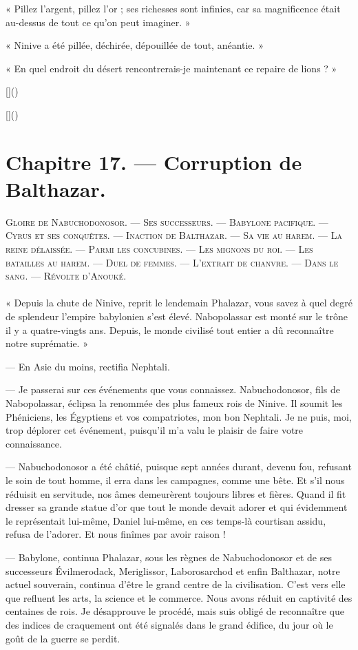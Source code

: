 \documentclass[a4paper, 11pt, oneside, polutonikogreek, french]{article}
\begin{document}
« Pillez l'argent, pillez l'or ; ses richesses sont infinies, car sa magnificence était au-dessus de tout ce qu'on peut imaginer. »

« Ninive a été pillée, déchirée, dépouillée de tout, anéantie. »

« En quel endroit du désert rencontrerais-je maintenant ce repaire de lions ? »

[]()

[]()
\clearpage
\section{Chapitre 17. --- Corruption de Balthazar.}
\begin{center}
\scshape
\small
Gloire de Nabuchodonosor. --- Ses successeurs. --- Babylone pacifique. --- Cyrus et ses conquêtes. --- Inaction de Balthazar. --- Sa vie au harem. --- La reine délaissée. --- Parmi les concubines. --- Les mignons du roi. --- Les batailles au harem. --- Duel de femmes. --- L'extrait de chanvre. --- Dans le sang. --- Révolte d'Anouké.
\end{center}
\paragraph{}
« Depuis la chute de Ninive, reprit le lendemain Phalazar, vous savez à quel degré de splendeur l'empire babylonien s'est élevé. Nabopolassar est monté sur le trône il y a quatre-vingts ans. Depuis, le monde civilisé tout entier a dû reconnaître notre suprématie. »

--- En Asie du moins, rectifia Nephtali.

--- Je passerai sur ces événements que vous connaissez. Nabuchodonosor, fils de Nabopolassar, éclipsa la renommée des plus fameux rois de Ninive. Il soumit les Phéniciens, les Égyptiens et vos compatriotes, mon bon Nephtali. Je ne puis, moi, trop déplorer cet événement, puisqu'il m'a valu le plaisir de faire votre connaissance.

--- Nabuchodonosor a été châtié, puisque sept années durant, devenu fou, refusant le soin de tout homme, il erra dans les campagnes, comme une bête. Et s'il nous réduisit en servitude, nos âmes demeurèrent toujours libres et fières. Quand il fit dresser sa grande statue d'or que tout le monde devait adorer et qui évidemment le représentait lui-même, Daniel lui-même, en ces temps-là courtisan assidu, refusa de l'adorer. Et nous finîmes par avoir raison !

--- Babylone, continua Phalazar, sous les règnes de Nabuchodonosor et de ses successeurs Évilmerodack, Meriglissor, Laborosarchod et enfin Balthazar, notre actuel souverain, continua d'être le grand centre de la civilisation. C'est vers elle que refluent les arts, la science et le commerce. Nous avons réduit en captivité des centaines de rois. Je désapprouve le procédé, mais suis obligé de reconnaître que des indices de craquement ont été signalés dans le grand édifice, du jour où le goût de la guerre se perdit.
\end{document}
